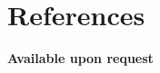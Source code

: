\documentclass[]{friggeri-cv}
\begin{document}
\section{References}

\textbf{Available upon request}

% 

\newpage
\end{document}
